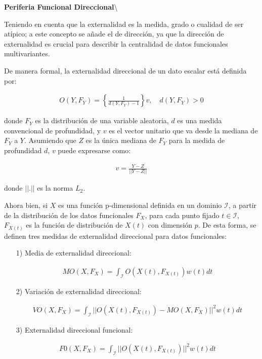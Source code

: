 \documentclass[
]{book}
\begin{document}
\textbf{Periferia Funcional Direccional}\textbackslash{}

Teniendo en cuenta que la externalidad es la medida, grado o cualidad de ser atípico; a este concepto se añade el de dirección, ya que la dirección de externalidad es crucial para describir la centralidad de datos funcionales multivariantes.

De manera formal, la externalidad direccional de un dato escalar está definida por:

\begin{align}
    O(Y,F_Y)=\left\{\frac{1}{d(Y,F_Y)-1}\right\}v,\quad d(Y,F_Y)>0
\end{align}

donde \(F_Y\) es la distribución de una variable aleatoria, \(d\) es una medida convencional de profundidad, y \(v\) es el vector unitario que va desde la mediana de \(F_Y\) a \(Y\). Asumiendo que \(Z\) es la única mediana de \(F_Y\) para la medida de profundidad \(d\), \(v\) puede expresarse como:

\begin{align}
    v=\frac{Y-Z}{||Y-Z||}
\end{align}

donde \(||.||\) es la norma \(L_2\).

Ahora bien, si \(X\) es una función p-dimensional definida en un dominio \(\mathcal{I}\), a partir de la distribución de los datos funcionales \(F_X\), para cada punto fijado \(t \in \mathcal{I}\), \(F_{X(t)}\) es la función de distribución de \(X(t)\) con dimensión \(p\). De esta forma, se definen tres medidas de externalidad direccional para datos funcionales:

\begin{itemize}
    \item[1)] Media de externalidad direccional:
    
  \begin{align}
        MO(X,F_X)=\int_{\mathcal{I}}O(X(t),F_{X(t)})w(t)dt
    \end{align}
    
  \item[2)] Variación de externalidad direccional:
    
  \begin{align}
        VO(X,F_{X})=\int_{\mathcal{I}} ||O(X(t),F_{X(t)})-MO(X,F_{X})||^2 w(t) dt
    \end{align}
    
  \item[3)] Externalidad direccional funcional:
    
  \begin{align}
        F0(X,F_X)=\int_{\mathcal{I}}||O(X(t),F_{X(t)})||^2w(t)dt
    \end{align}
    
\end{itemize}
\end{document}
